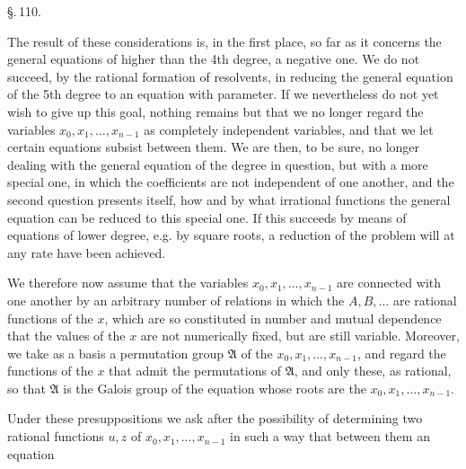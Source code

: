 \begin{center}
\S.\,110.

\end{center}

The result of these considerations is, in the first place, so far as it
concerns the general equations of higher than the 4th degree, a negative
one. We do not succeed, by the rational formation of resolvents, in
reducing the general equation of the 5th degree to an equation with 
parameter. If we nevertheless do not yet wish to give up this goal,
nothing remains but that we no longer regard the variables
$x_0, x_1, \ldots, x_{n-1}$ as completely independent variables, and that
we let certain equations subsist between them. We are then, to be sure,
no longer dealing with the general equation of the degree in question,
but with a more special one, in which the coefficients are not
independent of one another, and the second question presents itself, how
and by what irrational functions the general equation can be reduced to
this special one. If this succeeds by means of equations of lower degree,
e.g. by square roots, a reduction of the problem will at any rate have
been achieved.

We therefore now assume that the variables $x_0, x_1, \ldots, x_{n-1}$
are connected with one another by an arbitrary number of relations
in which the $A, B, \ldots$ are rational functions of the $x$, which are
so constituted in number and mutual dependence that the values of the $x$
are not numerically fixed, but are still variable. Moreover, we take as
a basis a permutation group $\mathfrak{A}$ of the
$x_0, x_1, \ldots, x_{n-1}$, and regard the functions of the $x$ that
admit the permutations of $\mathfrak{A}$, and only these, as rational,
so that $\mathfrak{A}$ is the Galois group of the equation whose roots
are the $x_0, x_1, \ldots, x_{n-1}$. 

Under these presuppositions we ask after the possibility of determining
two rational functions $u, z$ of $x_0, x_1, \ldots, x_{n-1}$ in such a
way that between them an equation

